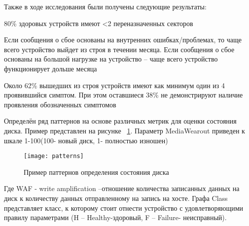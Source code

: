 Также в ходе исследования были получены следующие результаты:
\begin{itemize*}
	\item{80\% здоровых устройств имеют <2 переназначенных секторов}
    \item{Если сообщения о сбое основаны на внутренних ошибках/проблемах, то чаще всего устройство выйдет из строя в течении месяца. Если сообщения о сбое основаны на большой нагрузке на устройство – чаще всего устройство функционирует дольше месяца}
    \item{Около 62\% вышедших из строя устройств имеют как минимум один из 4 проявившийся симптом. При этом оставшиеся 38\% не демонстрируют наличие проявления обозначенных симптомов} 
    \item{Определён ряд паттернов на основе различных метрик для оценки состояния диска. Пример представлен на рисунке ~\ref{fig:patterns}. Параметр MediaWearout приведен к шкале 1-100(100- новый диск, 1- полностью изношен)}
\end{itemize*}

\begin{figure}[h]
	\centering
	\texttt{[image: patterns]}
	\caption{Пример паттернов определения состояния диска}
	\label{fig:patterns}
\end{figure}
 

Где WAF - write amplification –отношение количества записанных данных на диск к количеству данных отправленному на запись на хосте.
Графа Class представляет класс, к которому стоит отнести устройство с удовлетворяющими правилу параметрами (H – Healthy-здоровый, F – Failure- неисправный).


